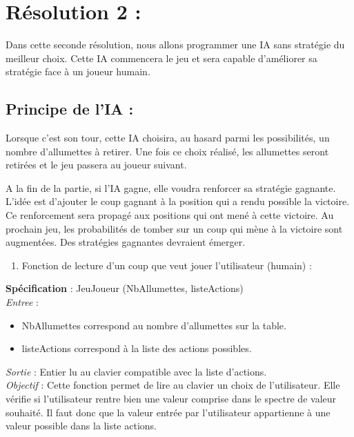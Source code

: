 \documentclass[
]{article}
\providecommand{\tightlist}{%
  \setlength{\itemsep}{0pt}\setlength{\parskip}{0pt}}
\begin{document}
\pagebreak

\hypertarget{ruxe9solution-2-1}{%
\section{Résolution 2 :}\label{ruxe9solution-2-1}}

Dans cette seconde résolution, nous allons programmer une IA sans
stratégie du meilleur choix. Cette IA commencera le jeu et sera capable
d'améliorer sa stratégie face à un joueur humain.

\hypertarget{principe-de-lia}{%
\subsection{Principe de l'IA :}\label{principe-de-lia}}

Lorsque c'est son tour, cette IA choisira, au hasard parmi les
possibilités, un nombre d'allumettes à retirer. Une fois ce choix
réalisé, les allumettes seront retirées et le jeu passera au joueur
suivant.

A la fin de la partie, si l'IA gagne, elle voudra renforcer sa stratégie
gagnante. L'idée est d'ajouter le coup gagnant à la position qui a rendu
possible la victoire. Ce renforcement sera propagé aux positions qui ont
mené à cette victoire. Au prochain jeu, les probabilités de tomber sur
un coup qui mène à la victoire sont augmentées. Des stratégies gagnantes
devraient émerger.

\begin{enumerate}
\def\labelenumi{\arabic{enumi}.}
\setcounter{enumi}{1}
\tightlist
\item
  Fonction de lecture d'un coup que veut jouer l'utilisateur (humain) :
\end{enumerate}

\textbf{Spécification} : JeuJoueur (NbAllumettes, listeActions)\\
\emph{Entree} : 
\begin{itemize}
\item NbAllumettes correspond au nombre d'allumettes sur la
table.
\item listeActions correspond à la liste des actions possibles.
\end{itemize}
\emph{Sortie} : Entier lu au clavier compatible avec la liste
d'actions.\\
\emph{Objectif} : Cette fonction permet de lire au clavier un choix de
l'utilisateur. Elle vérifie si l'utilisateur rentre bien une valeur
comprise dans le spectre de valeur souhaité. Il faut donc que la valeur
entrée par l'utilisateur appartienne à une valeur possible dans la liste
actions.
\end{document}
